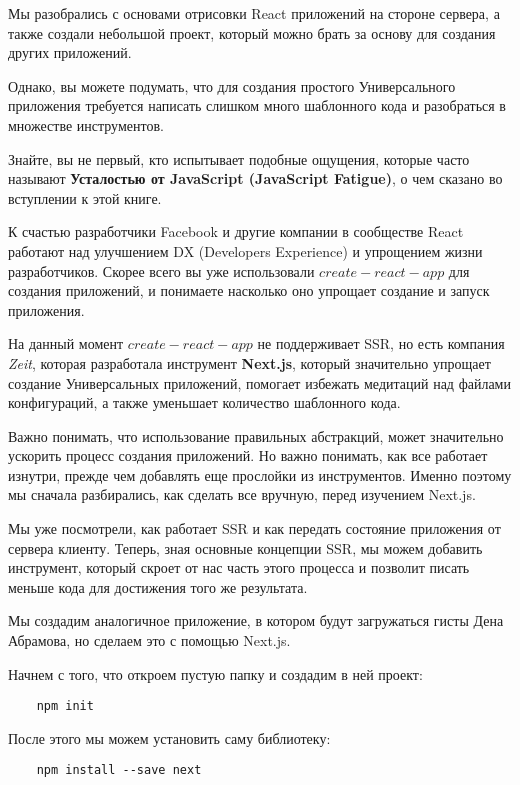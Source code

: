 Мы разобрались с основами отрисовки React приложений на стороне сервера, а также создали небольшой проект, который можно брать за основу для создания других приложений.

Однако, вы можете подумать, что для создания простого Универсального приложения требуется написать слишком много шаблонного кода и разобраться в множестве инструментов.

Знайте, вы не первый, кто испытывает подобные ощущения, которые часто называют \textbf{Усталостью от JavaScript (JavaScript Fatigue)}, о чем сказано во вступлении к этой книге.

К счастью разработчики Facebook и другие компании в сообществе React работают над улучшением DX (Developers Experience) и упрощением жизни разработчиков. Скорее всего вы уже использовали $create-react-app$ для создания приложений, и понимаете насколько оно упрощает создание и запуск приложения. 

На данный момент $create-react-app$ не поддерживает SSR, но есть компания \textit{Zeit}, которая разработала инструмент \textbf{Next.js}, который значительно упрощает создание Универсальных приложений, помогает избежать медитаций над файлами конфигураций, а также уменьшает количество шаблонного кода.

Важно понимать, что использование правильных абстракций, может значительно ускорить процесс создания приложений. Но важно понимать, как все работает изнутри, прежде чем добавлять еще прослойки из инструментов. Именно поэтому мы сначала разбирались, как сделать все вручную, перед изучением Next.js.

Мы уже посмотрели, как работает SSR и как передать состояние приложения от сервера клиенту. Теперь, зная основные концепции SSR, мы можем добавить инструмент, который скроет от нас часть этого процесса и позволит писать меньше кода для достижения того же результата.

Мы создадим аналогичное приложение, в котором будут загружаться гисты Дена Абрамова, но сделаем это с помощью Next.js.

Начнем с того, что откроем пустую папку и создадим в ней проект:

\begin{lstlisting}
	npm init
\end{lstlisting}

После этого мы можем установить саму библиотеку:

\begin{lstlisting}
	npm install --save next
\end{lstlisting}

